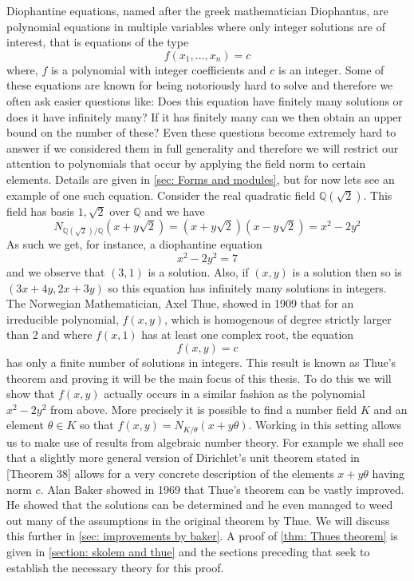 \documentclass{article}
\newcommand{\mbb}[1]{\mathbb{#1}}
\numberwithin{equation}{section}
\begin{document}
Diophantine equations, named after the greek mathematician Diophantus, are polynomial equations in multiple variables where only integer solutions are of interest, that is equations of the type 
$$f(x_1, ..., x_n) = c$$
where, $f$ is a polynomial with integer coefficients and $c$ is an integer. Some of these equations are known for being notoriously hard to solve and therefore we often ask easier questions like: Does this equation have finitely many solutions or does it have infinitely many? If it has finitely many can we then obtain an upper bound on the number of these? Even these questions become extremely hard to answer if we considered them in full generality and therefore we will restrict our attention to polynomials that occur by applying the field norm to certain elements. Details are given in \cref{sec: Forms and modules}, but for now lets see an example of one such equation. Consider the real quadratic field $\mbb Q(\sqrt 2)$. This field has basis $1,\sqrt 2$ over $\mbb Q$ and we have
$$N_{\mbb Q(\sqrt 2)/\mbb Q}(x + y\sqrt 2) = (x + y\sqrt 2)(x - y\sqrt 2) = x^2 - 2y^2$$
As such we get, for instance, a diophantine equation
$$x^2 - 2y^2 = 7$$
and we observe that $(3,1)$ is a solution. Also, if $(x,y)$ is a solution then so is $(3x + 4y, 2x + 3y)$ so this equation has infinitely many solutions in integers. The Norwegian Mathematician, Axel Thue, showed in 1909 that for an irreducible polynomial, $f(x,y)$, which is homogenous of degree strictly larger than 2 and where $f(x,1)$ has at least one complex root, the equation
$$f(x,y) = c$$
has only a finite number of solutions in integers. This result is known as Thue's theorem and proving it will be the main focus of this thesis. To do this we will show that $f(x,y)$ actually occurs in a similar fashion as the polynomial $x^2 - 2y^2$ from above. More precisely it is possible to find a number field $K$ and an element $\theta \in K$ so that $f(x,y) = N_{K / \theta}(x + y\theta)$. Working in this setting allows us to make use of results from algebraic number theory. For example we shall see that a slightly more general version of Dirichlet's unit theorem stated in \citep{marcus}[Theorem 38] allows for a very concrete description of the elements $x + y\theta$ having norm $c$. Alan Baker showed in 1969 that Thue's theorem can be vastly improved. He showed that the solutions can be determined and he even managed to weed out many of the assumptions in the original theorem by Thue. We will discuss this further in \cref{sec: improvements by baker}. A proof of \cref{thm: Thues theorem} is given in \cref{section: skolem and thue} and the sections preceding that seek to establish the necessary theory for this proof.  
\end{document}

